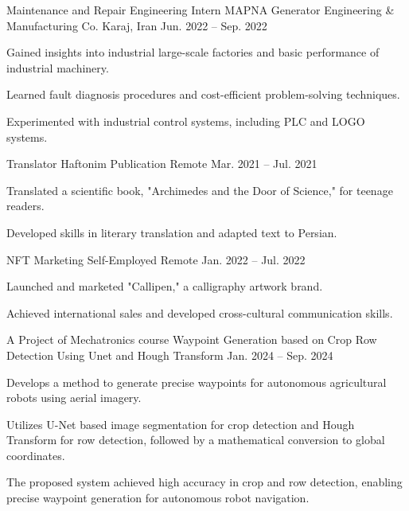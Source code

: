 \documentclass[11pt, a4paper]{awesome-cv}
\begin{document}
\begin{cventries}
	\cventry
	{Maintenance and Repair Engineering Intern}
	{MAPNA Generator Engineering \& Manufacturing Co.}
	{Karaj, Iran}
	{Jun. 2022 -- Sep. 2022}
	{
		\begin{cvitems}
			\item {Gained insights into industrial large-scale factories and basic performance of industrial machinery.}
			\item {Learned fault diagnosis procedures and cost-efficient problem-solving techniques.}
			\item {Experimented with industrial control systems, including PLC and LOGO systems.}
		\end{cvitems}
	}
	
	\cventry
	{Translator}
	{Haftonim Publication}
	{Remote}
	{Mar. 2021 -- Jul. 2021}
	{
		\begin{cvitems}
			\item {Translated a scientific book, "Archimedes and the Door of Science," for teenage readers.}
			\item {Developed skills in literary translation and adapted text to Persian.}
		\end{cvitems}
	}
	
	\cventry
	{NFT Marketing}
	{Self-Employed}
	{Remote}
	{Jan. 2022 -- Jul. 2022}
	{
		\begin{cvitems}
			\item {Launched and marketed "Callipen," a calligraphy artwork brand.}
			\item {Achieved international sales and developed cross-cultural communication skills.}
		\end{cvitems}
	}
	
		
	\cventry
	{A Project of Mechatronics course}
	{Waypoint Generation based on Crop Row Detection Using Unet and Hough Transform}
	{}
	{Jan. 2024 -- Sep. 2024}
	{
		\begin{cvitems}
			\item {Develops a method to generate precise waypoints for autonomous agricultural robots using aerial imagery.}
			\item {Utilizes U-Net based image segmentation for crop detection and Hough Transform for row detection, followed by a mathematical conversion to global coordinates.}
			\item {The proposed system achieved high accuracy in crop and row detection, enabling precise waypoint generation for autonomous robot navigation.}
		\end{cvitems}
	}


\end{cventries}
\end{document}
